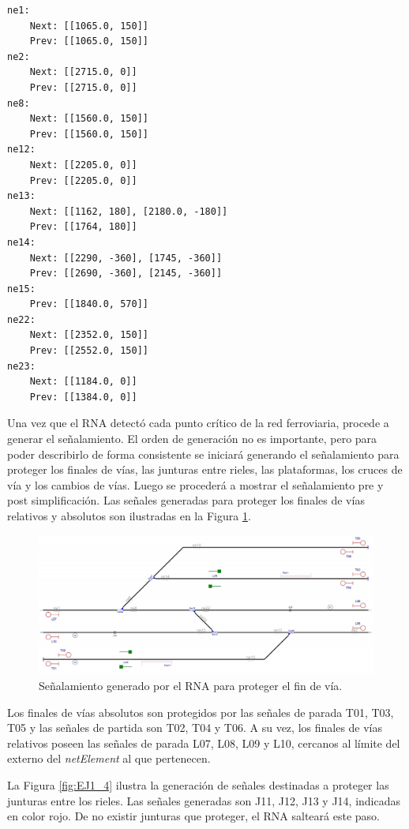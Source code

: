 	\begin{lstlisting}[language = {}, caption = SafePoints.RNA, label = {lst:EJ1_5}]
ne1:
	Next: [[1065.0, 150]]
	Prev: [[1065.0, 150]]
ne2:
	Next: [[2715.0, 0]]
	Prev: [[2715.0, 0]]
ne8:
	Next: [[1560.0, 150]]
	Prev: [[1560.0, 150]]
ne12:
	Next: [[2205.0, 0]]
	Prev: [[2205.0, 0]]
ne13:
	Next: [[1162, 180], [2180.0, -180]]
	Prev: [[1764, 180]]
ne14:
	Next: [[2290, -360], [1745, -360]]
	Prev: [[2690, -360], [2145, -360]]
ne15:
	Prev: [[1840.0, 570]]
ne22:
	Next: [[2352.0, 150]]
	Prev: [[2552.0, 150]]
ne23:
	Next: [[1184.0, 0]]
	Prev: [[1384.0, 0]]
	\end{lstlisting}
	
	Una vez que el RNA detectó cada punto crítico de la red ferroviaria, procede a generar el señalamiento. El orden de generación no es importante, pero para poder describirlo de forma consistente se iniciará generando el señalamiento para proteger los finales de vías, las junturas entre rieles, las plataformas, los cruces de vía y los cambios de vías. Luego se procederá a mostrar el señalamiento pre y post simplificación. Las señales generadas para proteger los finales de vías relativos y absolutos son ilustradas en la Figura \ref{fig:EJ1_3}.
	
	\begin{figure}[H]
		\centering
		\includegraphics[width=1\textwidth]{resultados-obtenidos/ejemplo1/images/1_step1.png}
		\centering\caption{Señalamiento generado por el RNA para proteger el fin de vía.}
		\label{fig:EJ1_3}
	\end{figure}
	
	Los finales de vías absolutos son protegidos por las señales de parada T01, T03, T05 y las señales de partida son T02, T04 y T06. A su vez, los finales de vías relativos poseen las señales de parada L07, L08, L09 y L10, cercanos al límite del externo del \textit{netElement} al que pertenecen.
	
	La Figura \ref{fig:EJ1_4} ilustra la generación de señales destinadas a proteger las junturas entre los rieles. Las señales generadas son J11, J12, J13 y J14, indicadas en color rojo. De no existir junturas que proteger, el RNA salteará este paso.
	
